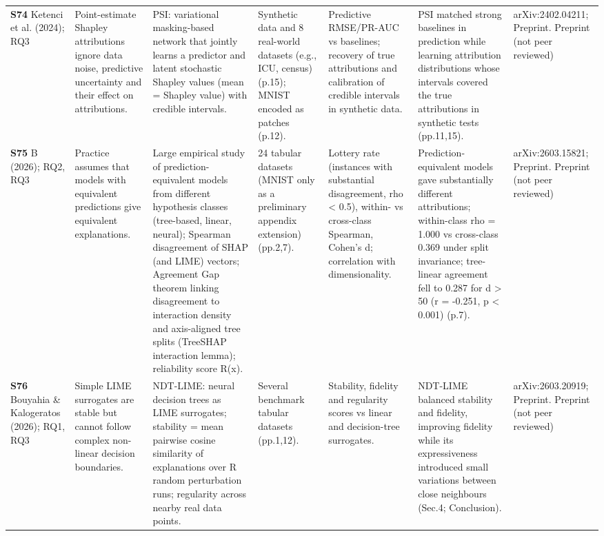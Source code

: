 \begin{longtable}{@{}P{1.55cm}P{2.9cm}P{4.5cm}P{3.2cm}P{3.4cm}P{4.6cm}P{3.6cm}@{}}
\textbf{S74} \cite{S74} Ketenci et al. (2024); RQ3 & Point-estimate Shapley attributions ignore data noise, predictive uncertainty and their effect on attributions. & PSI: variational masking-based network that jointly learns a predictor and latent stochastic Shapley values (mean = Shapley value) with credible intervals. & Synthetic data and 8 real-world datasets (e.g., ICU, census) (p.15); MNIST encoded as patches (p.12). & Predictive RMSE/\allowbreak{}PR-AUC vs baselines; recovery of true attributions and calibration of credible intervals in synthetic data. & PSI matched strong baselines in prediction while learning attribution distributions whose intervals covered the true attributions in synthetic tests (pp.11,15). & arXiv:2402.04211; Preprint. Preprint (not peer reviewed) \\
\textbf{S75} \cite{S75} B (2026); RQ2, RQ3 & Practice assumes that models with equivalent predictions give equivalent explanations. & Large empirical study of prediction-equivalent models from different hypothesis classes (tree-based, linear, neural); Spearman disagreement of SHAP (and LIME) vectors; Agreement Gap theorem linking disagreement to interaction density and axis-aligned tree splits (TreeSHAP interaction lemma); reliability score R(x). & 24 tabular datasets (MNIST only as a preliminary appendix extension) (pp.2,7). & Lottery rate (instances with substantial disagreement, rho \textless{} 0.5), within- vs cross-class Spearman, Cohen's d; correlation with dimensionality. & Prediction-equivalent models gave substantially different attributions; within-class rho = 1.000 vs cross-class 0.369 under split invariance; tree-linear agreement fell to 0.287 for d \textgreater{} 50 (r = -0.251, p \textless{} 0.001) (p.7). & arXiv:2603.15821; Preprint. Preprint (not peer reviewed) \\
\textbf{S76} \cite{S76} Bouyahia \& Kalogeratos (2026); RQ1, RQ3 & Simple LIME surrogates are stable but cannot follow complex non-linear decision boundaries. & NDT-LIME: neural decision trees as LIME surrogates; stability = mean pairwise cosine similarity of explanations over R random perturbation runs; regularity across nearby real data points. & Several benchmark tabular datasets (pp.1,12). & Stability, fidelity and regularity scores vs linear and decision-tree surrogates. & NDT-LIME balanced stability and fidelity, improving fidelity while its expressiveness introduced small variations between close neighbours (Sec.4; Conclusion). & arXiv:2603.20919; Preprint. Preprint (not peer reviewed) \\

\end{longtable}
